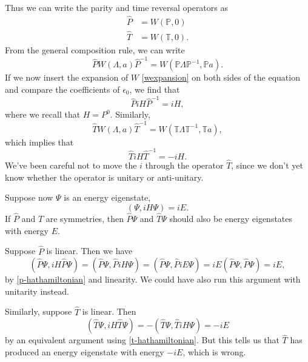 Thus we can write the parity and time reversal operators as
\begin{align*}
    \hat P &= W(\mathbb{P},0)\\
    \hat T &= W(\mathbb{T},0).
\end{align*}
From the general composition rule, we can write
\begin{equation}
    \hat P W(\Lambda, a) \hat P^{-1} = W(\mathbb{P} \Lambda \mathbb{P}^{-1}, \mathbb{P} a).
\end{equation}
If we now insert the expansion of $W$ \ref{wexpansion} on both sides of the equation and compare the coefficients of $\epsilon_0$, we find that
\begin{equation}\label{p-hathamiltonian}
    \hat P iH \hat P^{-1} = iH,
\end{equation}
where we recall that $H=P^0$.
Similarly,
\begin{equation}
    \hat T W(\Lambda, a)\hat T^{-1} = W(\mathbb{T} \Lambda \mathbb{T}^{-1},\mathbb{T} a),
\end{equation}
which implies that
\begin{equation}\label{t-hathamiltonian}
    \hat T i H \hat T^{-1}= - iH.
\end{equation}
We've been careful not to move the $i$ through the operator $\hat T$, since we don't yet know whether the operator is unitary or anti-unitary.

Suppose now $\Psi$ is an energy eigenstate,
\begin{equation*}
    (\Psi, iH \Psi)=i E.
\end{equation*}
If $\hat P$ and $\hat T$ are symmetries, then $\hat P \Psi$ and $\hat T \Psi$ should also be energy eigenstates with energy $E.$

Suppose $\hat P$ is linear. Then we have
\begin{equation}
    (\hat P \Psi, iH \hat P \Psi)=(\hat P \Psi, \hat P iH \Psi) = (\hat P \Psi, \hat P i E \Psi) = iE (\hat P \Psi, \hat P \Psi) = iE,
\end{equation}
by \ref{p-hathamiltonian} and linearity. We could have also run this argument with unitarity instead.

Similarly, suppose $\hat T$ is linear. Then
\begin{equation}
    (\hat T \Psi, i H \hat T \Psi) = -(\hat T \Psi, \hat T iH \Psi) = -iE
\end{equation}
by an equivalent argument using \ref{t-hathamiltonian}. But this tells us that $\hat T$ has produced an energy eigenstate with energy $-iE$, which is wrong.

